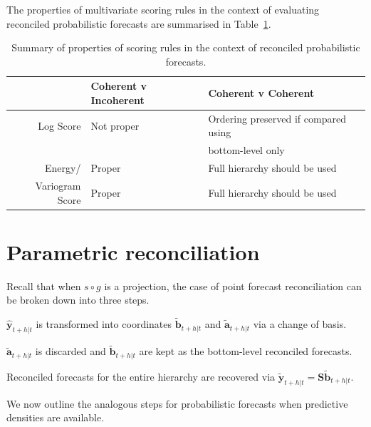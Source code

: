 \documentclass[12pt]{article}
\theoremstyle{definition}
\begin{document}
The properties of multivariate scoring rules in the context of evaluating reconciled probabilistic forecasts are summarised in Table~\ref{tab:prop}.

\begin{table}
	\caption{Summary of properties of scoring rules in the context of reconciled probabilistic forecasts.}
	\centering
	\begin{tabular}{rll}
		& Coherent v Incoherent &Coherent v Coherent\\
		\hline
		Log Score & Not proper & Ordering preserved if compared using\\ &&bottom-level only\\
		Energy/ & Proper & Full hierarchy should be used\\
		Variogram Score & Proper & Full hierarchy should be used\\
		\hline
	\end{tabular}
	
	\label{tab:prop}
\end{table}


\section{Parametric reconciliation} \label{sec:ParamRecon}

Recall that when $s\circ g$ is a projection, the case of point forecast reconciliation can be broken down into three steps.
\begin{compactenum}
\item  $\hat{\bm{y}}_{t+h|t}$ is transformed into coordinates $\tilde{\bm{b}}_{t+h|t}$ and $\tilde{\bm{a}}_{t+h|t}$ via a change of basis.
\item $\tilde{\bm{a}}_{t+h|t}$ is discarded and $\tilde{\bm{b}}_{t+h|t}$ are kept as the bottom-level reconciled forecasts.
\item Reconciled forecasts for the entire hierarchy are recovered via $\tilde{\bm{y}}_{t+h|t}=\bm{S}\tilde{\bm{b}}_{t+h|t}$.
\end{compactenum}

We now outline the analogous steps for probabilistic forecasts when predictive densities are available.
\end{document}

